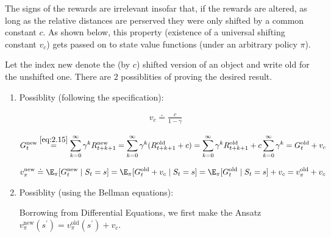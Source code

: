 \begin{solution}

The signs of the rewards are irrelevant insofar that, if the rewards are altered, as long as the relative distances are perserved they were only shifted by a common constant $c$.
As shown below, this property (existence of a universal shifting constant $v_c$) gets passed on to state value functions (under an arbitrary policy $\pi$).

Let the index $\text{new}$ denote the (by $c$) shifted version of an object and write $\text{old}$ for the unshifted one.
There are $2$ possiblities of proving the desired result.

\begin{enumerate}[label = \arabic*.]

    \item Possiblity (following the specification):
    
    \begin{align*}
        v_c \doteq \frac{c}{1 - \gamma}
    \end{align*}
    
    \begin{align*}
        G_t^\text{new}
        \stackrel
        {
            \eqref{eq:2.15}
        }{=}
        \sum_{k=0}^\infty
            \gamma^k R_{t+k+1}^\text{new}
        =
        \sum_{k=0}^\infty
            \gamma^k (R_{t+k+1}^\text{old} + c)
        =
        \sum_{k=0}^\infty
            \gamma^k R_{t+k+1}^\text{old}
        +
        c
        \sum_{k=0}^\infty
            \gamma^k
        =
        G_t^\text{old} + v_c
    \end{align*}

    \begin{align*}
        v_\pi^\text{new}
        \doteq
        \E_\pi[G_t^\text{new} \mid S_t = s]
        =
        \E_\pi[G_t^\text{old} + v_c \mid S_t = s]
        =
        \E_\pi[G_t^\text{old} \mid S_t = s] + v_c
        =
        v_\pi^\text{old} + v_c
    \end{align*}

    \item Possiblity (using the Bellman equations):
    
    Borrowing from Differential Equations, we first make the Ansatz $v_\pi^\text{new}(s^\prime) = v_\pi^\text{old}(s^\prime) + v_c$.


\end{enumerate}
\end{solution}
